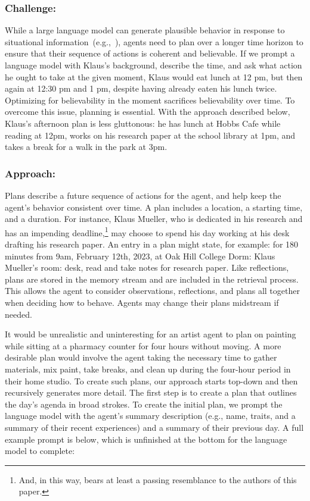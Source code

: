 \subsubsection*{Challenge:}
While a large language model can generate plausible behavior in response to situational information~(e.g.,~\cite{9_park2022socialsimulacra,63_horton2023large}), agents need to plan over a longer time horizon to ensure that their sequence of actions is coherent and believable. If we prompt a language model with Klaus's background, describe the time, and ask what action he ought to take at the given moment, Klaus would eat lunch at 12 pm, but then again at 12:30 pm and 1 pm, despite having already eaten his lunch twice. Optimizing for believability in the moment sacrifices believability over time. To overcome this issue, planning is essential. With the approach described below, Klaus's afternoon plan is less gluttonous: he has lunch at Hobbs Cafe while reading at 12pm, works on his research paper at the school library at 1pm, and takes a break for a walk in the park at 3pm.

\subsubsection*{Approach:}
Plans describe a future sequence of actions for the agent, and help keep the agent's behavior consistent over time. A plan includes a location, a starting time, and a duration. For instance, Klaus Mueller, who is {\color{darkgray}\small\fontfamily{}\selectfont
dedicated in his research} and has an impending deadline,\footnote{And, in this way, bears at least a passing resemblance to the authors of this paper.} may choose to spend his day working at his desk drafting his research paper. An entry in a plan might state, for example: {\color{darkgray}\small\fontfamily{}\selectfont
for 180 minutes from 9am, February 12th, 2023, at Oak Hill College Dorm: Klaus Mueller’s room: desk, read and take notes for research paper}. Like reflections, plans are stored in the memory stream and are included in the retrieval process. This allows the agent to consider observations, reflections, and plans all together when deciding how to behave. Agents may change their plans midstream if needed.

It would be unrealistic and uninteresting for an artist agent to plan on painting while sitting at a pharmacy counter for four hours without moving. A more desirable plan would involve the agent taking the necessary time to gather materials, mix paint, take breaks, and clean up during the four-hour period in their home studio. To create such plans, our approach starts top-down and then recursively generates more detail. The first step is to create a plan that outlines the day's agenda in broad strokes. To create the initial plan, we prompt the language model with the agent's summary description (e.g., name, traits, and a summary of their recent experiences) and a summary of their previous day. A full example prompt is below, which is unfinished at the bottom for the language model to complete:

